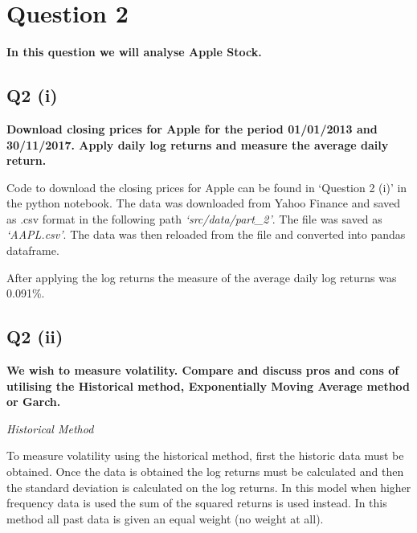 \section{Question 2}\label{ssec:pt2q2}
\textbf{In this question we will analyse Apple Stock.}

\subsection{Q2 (i)}\label{sssec:pt2q2i}

\textbf{Download closing prices for Apple for the period 01/01/2013 and 30/11/2017. Apply daily log returns and measure the average daily return.}

\noindent
Code to download the closing prices for Apple can be found in ‘Question 2 (i)’ in the python notebook. The data was downloaded from Yahoo Finance and saved as .csv format in the following path \textit{‘src/data/part\_2’}. The file was saved as \textit{‘AAPL.csv’}. The data was then reloaded from the file and converted into pandas dataframe.

\noindent
After applying the log returns the measure of the average daily log returns was 0.091\%.



\subsection{Q2 (ii)}\label{sssec:pt2q2ii}
\textbf{We wish to measure volatility. Compare and discuss pros and cons of utilising the Historical method, Exponentially Moving Average method or Garch.}

\noindent
\textit{Historical Method}

\noindent
To measure volatility using the historical method, first the historic data must be obtained. Once the data is obtained the log returns must be calculated and then the standard deviation is calculated on the log returns. In this model when higher frequency data is used the sum of the squared returns is used instead. In this method all past data is given an equal weight (no weight at all). 

